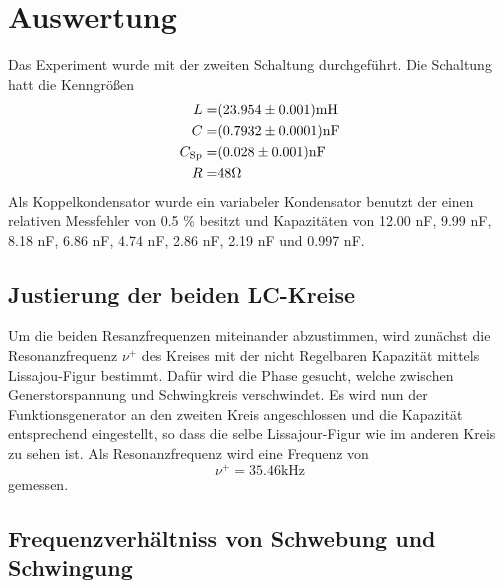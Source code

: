 \section{Auswertung}
\label{sec:Auswertung}
Das Experiment wurde mit der zweiten Schaltung durchgeführt. Die Schaltung hatt die Kenngrößen
\begin{eqnarray}
  L =& (\num{23.954 +- 0.001}) \text{mH}	\\
  C =& (\num{0.7932 +- 0.0001}) \text{nF}	\\
  C_\text{Sp} =& (\num{0.028 +- 0.001})	\text{nF}\\
  R =& 48 \Omega
\end{eqnarray}
Als Koppelkondensator wurde ein variabeler Kondensator benutzt der einen relativen Messfehler von 0.5 \% besitzt und Kapazitäten von 12.00 nF, 9.99 nF, 8.18 nF, 6.86 nF, 4.74 nF, 2.86 nF, 2.19 nF und 0.997 nF.

\subsection{Justierung der beiden LC-Kreise}
Um die beiden Resanzfrequenzen miteinander abzustimmen, wird zunächst die Resonanzfrequenz $\nu^+$ des Kreises mit der nicht Regelbaren Kapazität mittels Lissajou-Figur bestimmt. Dafür wird die Phase gesucht, welche zwischen Generstorspannung und Schwingkreis verschwindet. Es wird nun der Funktionsgenerator an den zweiten Kreis angeschlossen und die Kapazität entsprechend eingestellt, so dass die selbe Lissajour-Figur wie im anderen Kreis zu sehen ist.
Als Resonanzfrequenz wird eine Frequenz von
\begin{equation}
  \nu^+ = 35.46 \text{kHz}
  \label{nu+}
\end{equation}
gemessen.

\subsection{Frequenzverhältniss von Schwebung und Schwingung}

